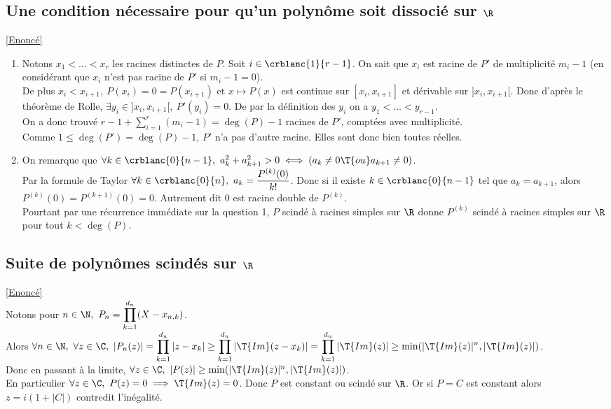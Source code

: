 \documentclass{book}
\begin{document}
	\subsection{Une condition nécessaire pour qu'un polynôme soit dissocié sur $\R$ }
	\label{sec:une-condition-nécessaire-pour-qu'un-polynôme-soit-dissocié-sur-R}
	\textcolor{blue}{\hyperref[Une condition nécessaire pour qu'un polynôme soit dissocié sur R]{[Enoncé]}}\\
	\begin{enumerate}
		\item Notons $x_1<\dots<x_r$ les racines distinctes de $P$.
		Soit $i\in \crblanc{1}{r-1}$. On sait que $x_i$ est racine de $P'$ de multiplicité $m_i-1$ (en considérant que $x_i$ n'est pas racine de $P'$ si $m_i-1=0$).\\
		De plus $x_i<x_{i+1},\ P(x_i)=0=P(x_{i+1}) \text{ et }x\mapsto P(x)$ est continue sur $[x_i,x_{i+1}]$ et dérivable sur $]x_i,x_{i+1}[$. Donc d'après le théorème de Rolle, $\exists y_i\in ]x_i,x_{i+1}[,\ P'(y_i)=0$. De par la définition des $y_i$ on a $y_1<\dots<y_{r-1}$.\\
		On a donc trouvé $r-1+\displaystyle\sum\limits_{i=1}^r{(m_i-1)}=\deg(P)-1$ racines de $P'$, comptées avec multiplicité.\\
		Comme $1\leq\deg(P')=\deg(P)-1$, $P'$ n'a pas d'autre racine. Elles sont donc bien toutes réelles.
		\item On remarque que $\forall k\in \crblanc{0}{n-1},\ a_k^2+a_{k+1}^2>0\iff (a_k\ne 0\T{ ou }a_{k+1}\ne 0)$.\\
		Par la formule de Taylor $\forall k\in\crblanc{0}{n},\ a_k=\dfrac{P^{(k)}(0)}{k!}$. Donc si il existe $k\in \crblanc{0}{n-1}$ tel que $a_k=a_{k+1}$, alors $P^{(k)}(0)=P^{(k+1)}(0)=0$. Autrement dit $0$ est racine double de $P^{(k)}$.\\
		Pourtant par une récurrence immédiate sur la question 1, $P$ scindé à racines simples sur $\R$ donne $P^{(k)}$ scindé à racines simples sur $\R$ pour tout $k<\deg(P)$.
	\end{enumerate}
	
	\subsection{Suite de polynômes scindés sur $\R$ }
	\label{sec:suite-de-polynômes-scindés-sur-R}
	\textcolor{blue}{\hyperref[Suite de polynômes scindés sur R]{[Enoncé]}}\\
	Notons pour $n\in \N,\ P_n=\displaystyle\prod_{k=1}^{d_n}(X-x_{n,k})$.\\
	Alors $\forall n\in \N,\ \forall z\in \C,\ |P_n(z)|=\displaystyle\prod_{k=1}^{d_n}|z-x_k|\geq\prod_{k=1}^{d_n}|\T{Im}(z-x_k)|=\prod_{k=1}^{d_n}|\T{Im}(z)|\geq \min(|\T{Im}(z)|^n,|\T{Im}(z)|)$.\\
	Donc en passant à la limite, $\forall z\in \C,\ |P(z)|\geq \min(|\T{Im}(z)|^n,|\T{Im}(z)|)$.\\
	En particulier $\forall z\in \C,\ P(z)=0\implies \T{Im}(z)=0$. Donc $P$ est constant ou scindé sur $\R$. Or si $P=C$ est constant alors $z=i(1+|C|)$ contredit l'inégalité.
	
\end{document}
